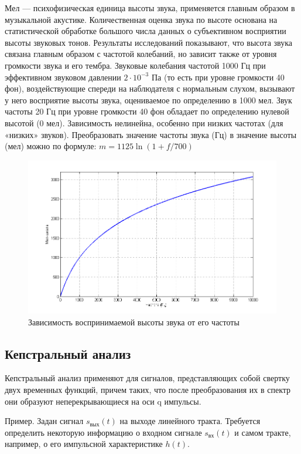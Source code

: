 \documentclass[14pt,russian,utf8,nocolumnsxix]{extarticle}
\begin{document}
Мел --- психофизическая единица высоты звука, применяется главным образом в музыкальной акустике. Количественная оценка звука по высоте основана на статистической обработке большого числа данных о субъективном восприятии высоты звуковых тонов. Результаты исследований показывают, что высота звука связана главным образом с частотой колебаний, но зависит также от уровня громкости звука и его тембра. Звуковые колебания частотой 1000 Гц при эффективном звуковом давлении $2 \cdot 10^{-3}$ Па (то есть при уровне громкости 40 фон), воздействующие спереди на наблюдателя с нормальным слухом, вызывают у него восприятие высоты звука, оцениваемое по определению в 1000 мел. Звук частоты 20 Гц при уровне громкости 40 фон обладает по определению нулевой высотой (0 мел). Зависимость нелинейна, особенно при низких частотах (для «низких» звуков).
Преобразовать значение частоты звука (Гц) в значение высоты (мел) можно по формуле: $m=1125\ln(1+f/700)$
\begin{figure}[H]
\centering
\includegraphics[width=120mm]{mel-scale.png}
\caption{Зависимость воспринимаемой высоты звука от его частоты}
\label{mel-scale}
\end{figure}

\subsection{Кепстральный анализ}
Кепстральный анализ применяют для сигналов, представляющих собой свертку двух временных функций, причем таких, что после преобразования их в спектр они образуют неперекрывающиеся на оси q импульсы.

Пример. Задан сигнал $s_{вых}(t)$ на выходе линейного тракта. Требуется определить некоторую информацию о входном сигнале $s_{вх}(t)$ и самом тракте, например, о его импульсной характеристике $h(t)$.
\end{document}
